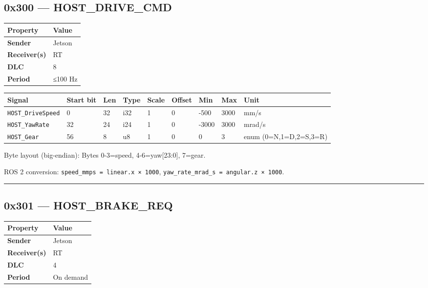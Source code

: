 \documentclass[12pt,a4paper,oneside]{report}
\begin{document}
\subsection{0x300 --- HOST\_DRIVE\_CMD}\label{x300-host_drive_cmd}

\begin{longtable}[]{@{}ll@{}}
\toprule\noalign{}
Property & Value \\
\midrule\noalign{}
\endhead
\bottomrule\noalign{}
\endlastfoot
\textbf{Sender} & Jetson \\
\textbf{Receiver(s)} & RT \\
\textbf{DLC} & 8 \\
\textbf{Period} & ≤100 Hz \\
\end{longtable}

\begin{longtable}[]{@{}lllllllll@{}}
\toprule\noalign{}
Signal & Start bit & Len & Type & Scale & Offset & Min & Max & Unit \\
\midrule\noalign{}
\endhead
\bottomrule\noalign{}
\endlastfoot
\texttt{HOST\_DriveSpeed} & 0 & 32 & i32 & 1 & 0 & -500 & 3000 & mm/s \\
\texttt{HOST\_YawRate} & 32 & 24 & i24 & 1 & 0 & -3000 & 3000 & mrad/s \\
\texttt{HOST\_Gear} & 56 & 8 & u8 & 1 & 0 & 0 & 3 & enum (0=N,1=D,2=S,3=R) \\
\end{longtable}

Byte layout (big-endian): Bytes 0-3=speed, 4-6=yaw{[}23:0{]}, 7=gear.

ROS 2 conversion: \texttt{speed\_mmps\ =\ linear.x\ ×\ 1000},
\texttt{yaw\_rate\_mrad\_s\ =\ angular.z\ ×\ 1000}.

\begin{center}\rule{0.5\linewidth}{0.5pt}\end{center}

\subsection{0x301 --- HOST\_BRAKE\_REQ}\label{x301-host_brake_req}

\begin{longtable}[]{@{}ll@{}}
\toprule\noalign{}
Property & Value \\
\midrule\noalign{}
\endhead
\bottomrule\noalign{}
\endlastfoot
\textbf{Sender} & Jetson \\
\textbf{Receiver(s)} & RT \\
\textbf{DLC} & 4 \\
\textbf{Period} & On demand \\
\end{longtable}
\end{document}
